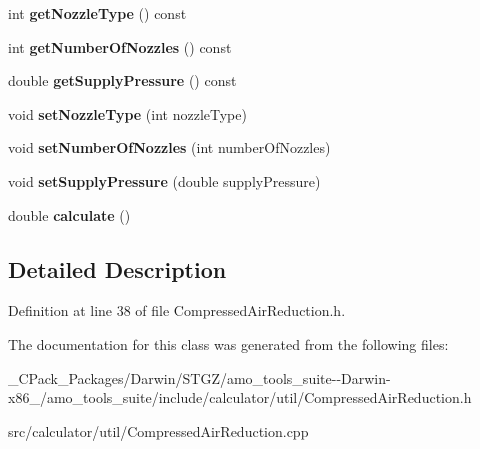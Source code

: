 \begin{DoxyCompactItemize}
int {\bfseries get\+Nozzle\+Type} () const
\item 
\mbox{\label{class_pressure_method_data_acdb45460fa558f7d93b649c5304a8e1c}} 
int {\bfseries get\+Number\+Of\+Nozzles} () const
\item 
\mbox{\label{class_pressure_method_data_a99913643fee384381bd634a14c113d77}} 
double {\bfseries get\+Supply\+Pressure} () const
\item 
\mbox{\label{class_pressure_method_data_a2f6ad84c90de786d6cee92dd89073e5c}} 
void {\bfseries set\+Nozzle\+Type} (int nozzle\+Type)
\item 
\mbox{\label{class_pressure_method_data_ac02b84da973601d4533f40396d3aa8c8}} 
void {\bfseries set\+Number\+Of\+Nozzles} (int number\+Of\+Nozzles)
\item 
\mbox{\label{class_pressure_method_data_a2319ade60f1e688bed667c8bdc969291}} 
void {\bfseries set\+Supply\+Pressure} (double supply\+Pressure)
\item 
\mbox{\label{class_pressure_method_data_a85415f718377f2ee10c1bbd36f4ffef1}} 
double {\bfseries calculate} ()
\end{DoxyCompactItemize}


\subsection{Detailed Description}


Definition at line 38 of file Compressed\+Air\+Reduction.\+h.



The documentation for this class was generated from the following files\+:\begin{DoxyCompactItemize}
\item 
\+\_\+\+C\+Pack\+\_\+\+Packages/\+Darwin/\+S\+T\+G\+Z/amo\+\_\+tools\+\_\+suite-\/-\/\+Darwin-\/x86\+\_/amo\+\_\+tools\+\_\+suite/include/calculator/util/Compressed\+Air\+Reduction.\+h\item 
src/calculator/util/Compressed\+Air\+Reduction.\+cpp\end{DoxyCompactItemize}
